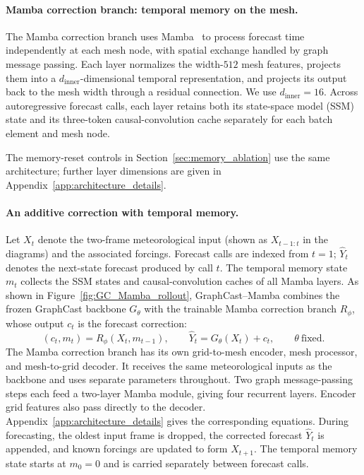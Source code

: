 \documentclass{article}
\begin{document}
\paragraph{{Mamba correction branch: temporal memory on the mesh.}}
The Mamba correction branch uses Mamba~\citep{gu2023mamba} to process forecast time independently at each mesh node, with spatial exchange handled by graph message passing. Each layer normalizes the width-$512$ mesh features, projects them into a $d_{\mathrm{inner}}$-dimensional temporal representation, and projects its output back to the mesh width through a residual connection. We use $d_{\mathrm{inner}}=16$. Across autoregressive forecast calls, each layer retains both its {state-space model (SSM) state} and its three-token causal-convolution cache separately for each batch element and mesh node.

The memory-reset controls in Section~\ref{sec:memory_ablation} use the same architecture; further layer dimensions are given in Appendix~\ref{app:architecture_details}.


\paragraph{An additive correction with temporal memory.}
Let $X_t$ denote the two-frame meteorological input (shown as $X_{t-1:t}$ in the diagrams) and the associated forcings. Forecast calls are indexed from $t=1$; $\hat{Y}_t$ denotes the next-state forecast produced by call $t$. The temporal memory state $m_t$ collects the SSM states and causal-convolution caches of all Mamba layers. As shown in Figure~\ref{fig:GC_Mamba_rollout}, {GraphCast--Mamba combines the frozen GraphCast backbone $G_\theta$ with the trainable Mamba correction branch $R_\phi$, whose output $c_t$ is the forecast correction}:
\vspace{-4pt}
\begin{equation}
    (c_t,m_t)=R_\phi(X_t,m_{t-1}),
    \qquad
    \hat{Y}_t=G_\theta(X_t)+c_t,
    \qquad \theta\ \text{fixed}.
    \label{eq:additive_correction}
\end{equation}
The Mamba correction branch has its own grid-to-mesh encoder, mesh processor, and mesh-to-grid decoder. It receives the same meteorological inputs as the backbone and uses separate parameters throughout. Two graph message-passing steps each feed a two-layer Mamba module, giving four recurrent layers. Encoder grid features also pass directly to the decoder. Appendix~\ref{app:architecture_details} gives the corresponding equations. During forecasting, the oldest input frame is dropped, the corrected forecast $\hat{Y}_t$ is appended, and known forcings are updated to form $X_{t+1}$. The temporal memory state starts at $m_0=0$ and is carried separately between forecast calls.
\end{document}
